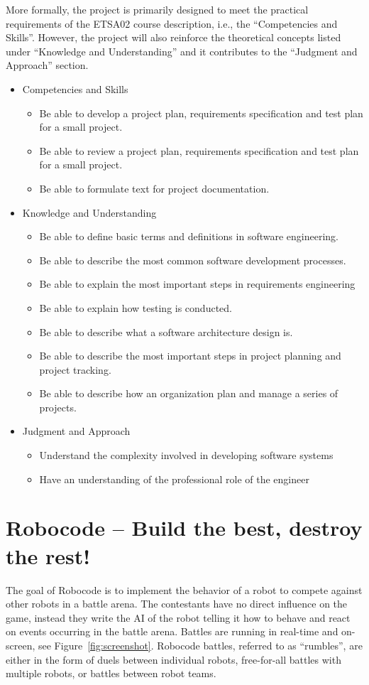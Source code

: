 \documentclass{scrreprt}
\begin{document}
More formally, the project is primarily designed to meet the practical requirements of the ETSA02 course description, i.e., the ``Competencies and Skills''. However, the project will also reinforce the theoretical concepts listed under ``Knowledge and Understanding'' and it contributes to the ``Judgment and Approach'' section.
\begin{itemize}
\item Competencies and Skills
\begin{itemize}
\item Be able to develop a project plan, requirements specification and test plan for a small project.
\item Be able to review a project plan, requirements specification and test plan for a small project.
\item Be able to formulate text for project documentation.
\end{itemize}
\item Knowledge and Understanding
\begin{itemize}
\item Be able to define basic terms and definitions in software engineering.
\item Be able to describe the most common software development processes.
\item Be able to explain the most important steps in requirements engineering
\item Be able to explain how testing is conducted.
\item Be able to describe what a software architecture design is.
\item Be able to describe the most important steps in project planning and project tracking.
\item Be able to describe how an organization plan and manage a series of projects.
\end{itemize}
\item Judgment and Approach
\begin{itemize}
\item Understand the complexity involved in developing software systems
\item Have an understanding of the professional role of the engineer
\end{itemize}
\end{itemize}

\section{Robocode -- Build the best, destroy the rest!}
The goal of Robocode is to implement the behavior of a robot to compete against other robots in a battle arena. The contestants have no direct influence on the game, instead they write the AI of the robot telling it how to behave and react on events occurring in the battle arena. Battles are running in real-time and on-screen, see Figure~\ref{fig:screenshot}. Robocode battles, referred to as ``rumbles'', are either in the form of duels between individual robots, free-for-all battles with multiple robots, or battles between robot teams.
\end{document}
